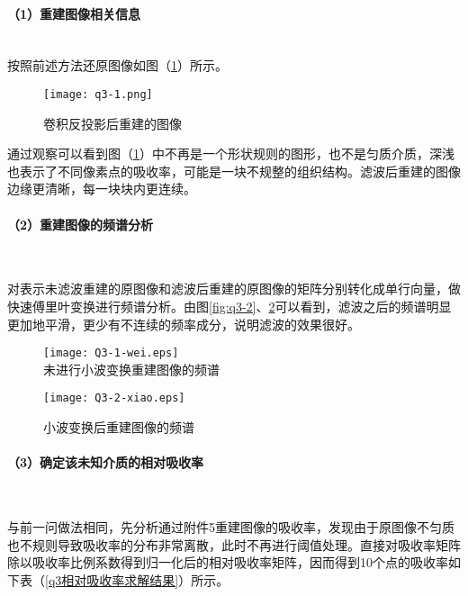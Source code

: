 \documentclass[withoutpreface,bwprint]{cumcmthesis} %
\begin{document}
\newpage
\paragraph*{（1）重建图像相关信息}~\\
按照前述方法还原图像如图（\ref{fig:q3-1}）所示。
\begin{figure}[h]
\small
\centering
\texttt{[image: q3-1.png]}
\caption{卷积反投影后重建的图像} \label{fig:q3-1}
\end{figure}


\par 通过观察可以看到图（\ref{fig:q3-1}）中不再是一个形状规则的图形，也不是匀质介质，深浅也表示了不同像素点的吸收率，可能是一块不规整的组织结构。滤波后重建的图像边缘更清晰，每一块块内更连续。

\paragraph*{（2）重建图像的频谱分析}~\\

\par 对表示未滤波重建的原图像和滤波后重建的原图像的矩阵分别转化成单行向量，做快速傅里叶变换进行频谱分析。由图\ref{fig:q3-2}、\ref{fig:q3-3}可以看到，滤波之后的频谱明显更加地平滑，更少有不连续的频率成分，说明滤波的效果很好。
\begin{figure}[!htbp]  
\begin{minipage}[t]{0.5\textwidth}
\centering  
\texttt{[image: Q3-1-wei.eps]} \\
\caption{未进行小波变换重建图像的频谱} \label{fig:q3-2}
\end{minipage}
\hspace{1ex}
\begin{minipage}[t]{0.5\textwidth}  
\centering  
\texttt{[image: Q3-2-xiao.eps]}\\
\caption{小波变换后重建图像的频谱}  \label{fig:q3-3}
\end{minipage}  
\end{figure} 


\paragraph*{（3）确定该未知介质的相对吸收率}~\\
	
\par 与前一问做法相同，先分析通过附件5重建图像的吸收率，发现由于原图像不匀质也不规则导致吸收率的分布非常离散，此时不再进行阈值处理。直接对吸收率矩阵除以吸收率比例系数得到归一化后的相对吸收率矩阵，因而得到10个点的吸收率如下表（\ref{q3相对吸收率求解结果}）所示。
	
\end{document}
